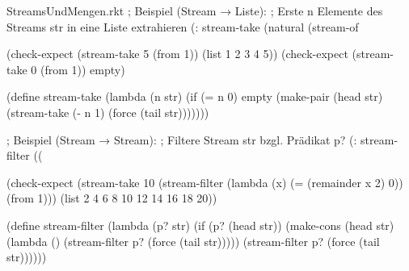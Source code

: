 \begin{filecontents*}{StreamsUndMengen.rkt}
; Beispiel (Stream → Liste):
; Erste n Elemente des Streams str in eine Liste extrahieren
(: stream-take (natural (stream-of %

(check-expect (stream-take 5 (from 1)) (list 1 2 3 4 5))
(check-expect (stream-take 0 (from 1)) empty)

(define stream-take
  (lambda (n str)
    (if (= n 0)
        empty
        (make-pair (head str) 
                   (stream-take (- n 1) (force (tail str)))))))

; Beispiel (Stream → Stream):
; Filtere Stream str bzgl. Prädikat p?
(: stream-filter ((%

(check-expect (stream-take 10 
                           (stream-filter (lambda (x) (= (remainder x 2) 0)) 
                                          (from 1)))
              (list 2 4 6 8 10 12 14 16 18 20))

(define stream-filter
  (lambda (p? str)
    (if (p? (head str))
        (make-cons (head str)
                   (lambda () (stream-filter p? (force (tail str)))))
        (stream-filter p? (force (tail str))))))










\end{filecontents*}
